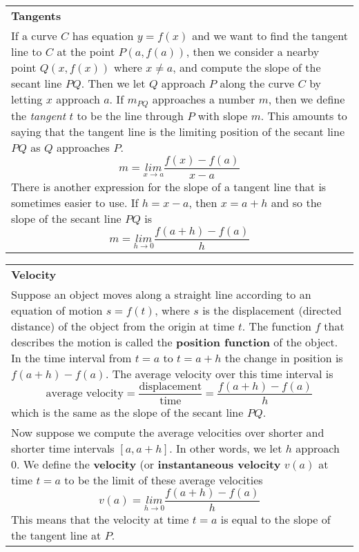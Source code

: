 \documentclass[fleqn]{article}
\begin{document}
\begin{center}
\large
\def\arraystretch{1.3}
{\setlength{\tabcolsep}{16pt}
\begin{tabularx}{.9\textwidth}{|X|}
\hline
	\vspace{1pt}
	\textbf{Tangents} \\
	If a curve $C$ has equation $y = f(x)$ and we want to find the tangent line to $C$ at the point $P(a, f(a))$, then we consider a nearby point $Q(x, f(x))$ where $x \ne a$, and compute the slope of the secant line $PQ$. Then we let $Q$ approach $P$ along the curve $C$ by letting $x$ approach $a$. If $m_{PQ}$ approaches a number $m$, then we define the \textit{tangent} $t$ to be the line through $P$ with slope $m$. This amounts to saying that the tangent line is the limiting position of the secant line $PQ$ as $Q$ approaches $P$.
	$$m = \underset{x \to a}{lim} \dfrac{f(x) - f(a)}{x-a}$$
	There is another expression for the slope of a tangent line that is sometimes easier to use. If $h=x-a$, then $x=a+h$ and so the slope of the secant line $PQ$ is 
	$$m = \underset{h \to 0}{lim} \dfrac{f(a+h) - f(a)}{h}$$
	\\
	\hline
\end{tabularx}}
\vspace{12pt}

\def\arraystretch{1.3}
{\setlength{\tabcolsep}{16pt}
\begin{tabularx}{.9\textwidth}{|X|}
\hline
	\vspace{1pt}
	\textbf{Velocity} \\
	Suppose an object moves along a straight line according to an equation of motion $s = f(t)$, where $s$ is the displacement (directed distance) of the object from the origin at time $t$. The function $f$ that describes the motion is called the \textbf{position function} of the object. In the time interval from $t=a$ to $t=a+h$ the change in position is $f(a+h) - f(a)$. The average velocity over this time interval is
	$$\text{average velocity} = \dfrac{\text{displacement}}{\text{time}} = \dfrac{f(a+h) - f(a)}{h}$$
	which is the same as the slope of the secant line $PQ$. \\
	Now suppose we compute the average velocities over shorter and shorter time intervals $[a, a+h]$. In other words, we let $h$ approach $0$. We define the \textbf{velocity} (or \textbf{instantaneous velocity} $v(a)$ at time $t=a$ to be the limit of these average velocities
	$$v(a) = \underset{h \to 0}{lim} \dfrac{f(a+h) - f(a)}{h}$$
	This means that the velocity at time $t=a$ is equal to the slope of the tangent line at $P$. 
	\\[16pt]
	\hline
\end{tabularx}}
\vspace{12pt}


\end{center}
\end{document}

